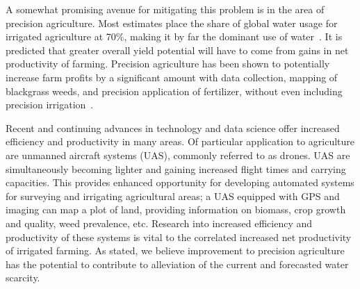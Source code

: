 A somewhat promising avenue for mitigating this problem is in the area of precision agriculture.
Most estimates place the share of global water usage for irrigated agriculture at 70\%, making it by far the dominant use of water~\cite{waterscarce}.
It is predicted that greater overall yield potential will have to come from gains in net productivity of farming.
Precision agriculture has been shown to potentially increase farm profits by a significant amount with data collection, mapping of blackgrass weeds, and precision application of fertilizer, without even including precision irrigation~\cite{precisionagfuture}.


Recent and continuing advances in technology and data science offer increased efficiency and productivity in many areas.
Of particular application to agriculture are unmanned aircraft systems (UAS), commonly referred to as drones.
UAS are simultaneously becoming lighter and gaining increased flight times and carrying capacities.
This provides enhanced opportunity for developing automated systems for surveying and irrigating agricultural areas; a UAS equipped with GPS and imaging can map a plot of land, providing information on biomass, crop growth and quality, weed prevalence, etc.
Research into increased efficiency and productivity of these systems is vital to the correlated increased net productivity of irrigated farming.
As stated, we believe improvement to precision agriculture has the potential to contribute to alleviation of the current and forecasted water scarcity.




